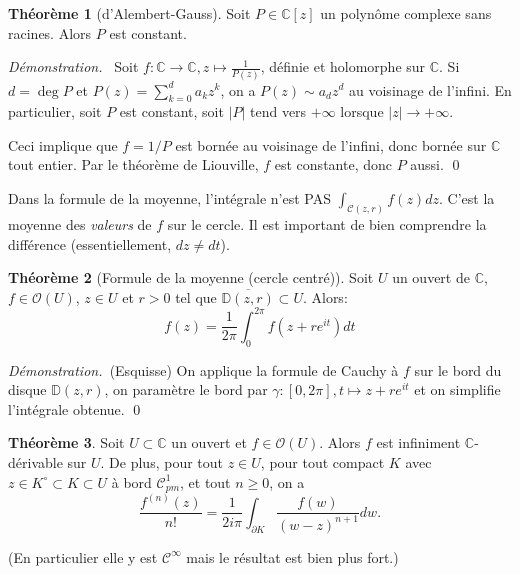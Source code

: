 \documentclass[11pt,a4paper]{article}
\newcommand{\D}{\mathbb{D}}
\newcommand{\C}{\mathbb{C}}
\theoremstyle{definition}
\newtheorem{theoreme}{Th\'eor\`eme}[section]
\renewenvironment{proof}{\color{preuve}\emph{Démonstration.~}}{\qed\vspace{1em}}
\theoremstyle{plain}
\begin{document}
\begin{theoreme}[d'Alembert-Gauss]
Soit $P \in \C[z]$ un polynôme complexe sans racines. Alors $P$ est constant.
\end{theoreme}

\begin{proof}
Soit $f : \C\to\C, z\mapsto \frac{1}{P(z)}$, définie et holomorphe sur $\C$.
Si $d = \deg P$ et $P(z) = \sum_{k=0}^d a_kz^k$, on a $P(z) \sim a_dz^d$ au voisinage de l'infini. En particulier, soit $P$ est constant, soit $|P|$ tend vers $+\infty$ lorsque $|z|\to +\infty$.

Ceci implique que $f=1/P$ est bornée au voisinage de l'infini, donc bornée sur $\C$ tout entier. Par le théorème de Liouville, $f$ est constante, donc $P$ aussi.
\end{proof}

\begin{attention}
Dans la formule de la moyenne, l'intégrale n'est PAS $\int_{\mathcal C(z,r)} f(z)dz$. C'est la moyenne des \emph{valeurs} de $f$ sur le cercle. Il est important de bien comprendre la différence (essentiellement, $dz\neq dt$). 
\end{attention}
\begin{theoreme}[Formule de la moyenne (cercle centré)]
Soit $U$ un ouvert de $\C$,  $f\in \mathcal O(U)$,  $z\in U$ et $r>0$ tel que $\overline{\D(z,r)} \subset U$.
Alors:
\[ f(z) = \frac{1}{2\pi}\int_0^{2\pi} f\left(z+re^{it}\right)dt\]
\end{theoreme}

\begin{proof}(Esquisse)
On applique la formule de Cauchy à $f$ sur le bord du disque $\D(z,r)$, on paramètre le bord par $\gamma : [0,2\pi], t\mapsto z+re^{it}$ et on simplifie l'intégrale obtenue.
\end{proof}





\begin{theoreme}
Soit $U\subset \C$ un ouvert et $f\in \mathcal O(U)$.
Alors $f$ est infiniment $\C$-dérivable sur $U$. 
De plus, pour tout $z\in U$, pour tout compact $K$ avec $z\in K^\circ \subset K \subset U$ à bord $\mathcal C^1_{pm}$, et tout $n\geq 0$, on a 
\[ \frac{f^{(n)}(z)}{n!} = \frac{1}{2i\pi}\int_{\partial K} \frac{f(w)}{(w-z)^{n+1}}dw.\]
\end{theoreme}
(En particulier elle y est $\mathcal C^\infty$ mais le résultat est bien plus fort.)
\end{document}
